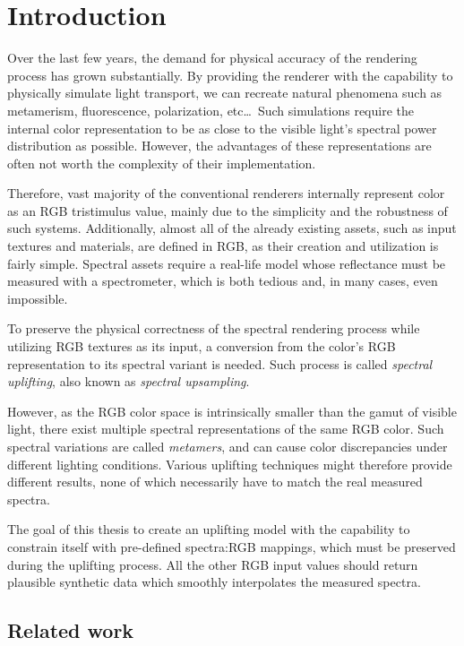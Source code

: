 \chapter*{Introduction}

Over the last few years, the demand for physical accuracy of the rendering process has grown substantially. By providing the renderer with the capability to physically simulate light transport, we can recreate natural phenomena such as metamerism, fluorescence, polarization, etc\ldots~Such simulations require the internal color representation to be as close to the visible light's spectral power distribution as possible. However, the advantages of these representations are often not worth the complexity of their implementation.

Therefore, vast majority of the conventional renderers internally represent color as an RGB tristimulus value, mainly due to the simplicity and the robustness of such systems. Additionally, almost all of the already existing assets, such as input textures and materials, are defined in RGB, as their creation and utilization is fairly simple. Spectral assets require a real-life model whose reflectance must be measured with a spectrometer, which is both tedious and, in many cases, even impossible.

To preserve the physical correctness of the spectral rendering process while utilizing RGB textures as its input, a conversion from the color's RGB representation to its spectral variant is needed. Such process is called \emph{spectral uplifting}, also known as \emph{spectral upsampling}.

However, as the RGB color space is intrinsically smaller than the gamut of visible light, there exist multiple spectral representations of the same RGB color. Such spectral variations are called \emph{metamers}, and can cause color discrepancies under different lighting conditions. Various uplifting techniques might therefore provide different results, none of which necessarily have to match the real measured spectra.

The goal of this thesis to create an uplifting model with the capability to constrain itself with pre-defined spectra:RGB mappings, which must be preserved during the uplifting process. All the other RGB input values should return plausible synthetic data which smoothly interpolates the measured spectra.
 
\section*{Related work}

